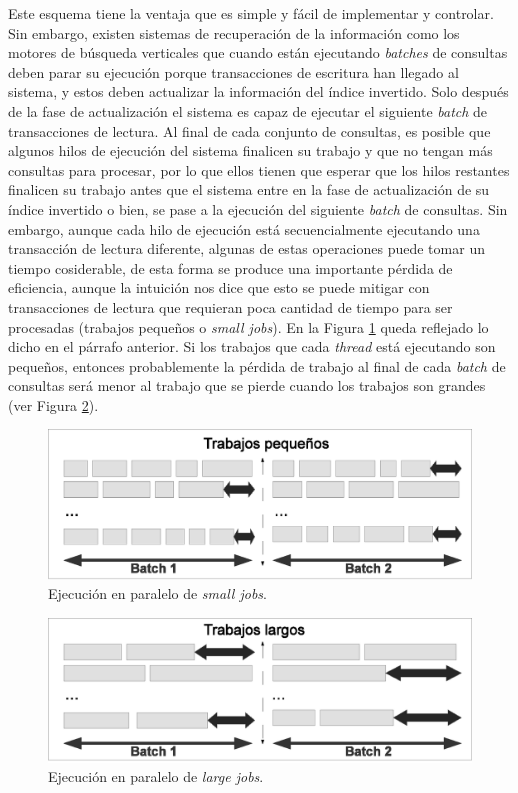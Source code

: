 Este esquema tiene la ventaja que es simple y fácil de implementar y controlar. Sin embargo, existen sistemas de recuperación de la información como los motores de búsqueda verticales que cuando están ejecutando \textit{batches} de consultas deben parar su ejecución porque transacciones de escritura han llegado al sistema, y estos deben actualizar la información del índice invertido. Solo después de la fase de actualización el sistema es capaz de ejecutar el siguiente \textit{batch} de transacciones de lectura. Al final de cada conjunto de consultas, es posible que algunos hilos de ejecución del sistema finalicen su trabajo y que no tengan más consultas para procesar, por lo que ellos tienen que esperar que los hilos restantes finalicen su trabajo antes que el sistema entre en la fase de actualización de su índice invertido o bien, se pase a la ejecución del siguiente \textit{batch} de consultas.
Sin embargo, aunque cada hilo de ejecución está secuencialmente ejecutando una transacción de lectura diferente, algunas de estas operaciones puede tomar un tiempo cosiderable, de esta forma se produce una importante pérdida de eficiencia, aunque la intuición nos dice que esto se puede mitigar con transacciones de lectura que requieran poca cantidad de tiempo para ser procesadas (trabajos pequeños o \textit{small jobs}). 
En la Figura \ref{fig:small_jobs} queda reflejado lo dicho en el párrafo anterior. Si los trabajos que cada \textit{thread} está ejecutando son pequeños, entonces probablemente la pérdida de trabajo al final de cada \textit{batch} de consultas será menor al trabajo que se pierde cuando los trabajos son grandes (ver Figura \ref{fig:large_jobs}).  

\begin{figure}[H]
\centering
\includegraphics[scale=.75]{images/small_jobs.eps}
\caption{Ejecución en paralelo de \textit{small jobs}.}
\label{fig:small_jobs}
\end{figure}

\begin{figure}[H]
\centering
\includegraphics[scale=.75]{images/large_jobs.eps}
\caption{Ejecución en paralelo de \textit{large jobs}.}
\label{fig:large_jobs}
\end{figure}


